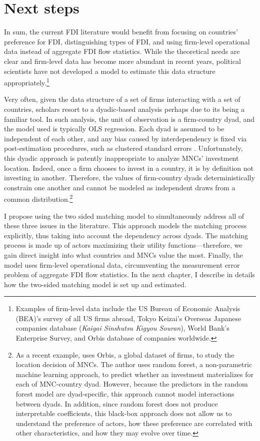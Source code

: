 \section{Next steps}

In sum, the current FDI literature would benefit from focusing on countries'
preference for FDI, distinguishing types of FDI, and using firm-level
operational data instead of aggregate FDI flow statistics. While the theoretical
needs are clear and firm-level data has become more abundant in recent years,
political scientists have not developed a model to estimate this data structure
appropriately.\footnote{Examples of firm-level data include the US Bureau of
  Economic Analysis (BEA)'s survey of all US firms abroad, Tokyo Keizai's
  Overseas Japanese companies database (\textit{Kaigai Sinshutsu Kigyou
    Souran}), World Bank's Enterprise Survey, and Orbis database of companies
  worldwide.}

Very often, given the data structure of a set of firms interacting with a set of
countries, scholars resort to a dyadic-based analysis perhaps due to its being a
familiar tool. In such analysis, the unit of observation is a firm-country dyad,
and the model used is typically OLS regression. Each dyad is assumed to be
independent of each other, and any bias caused by interdependency is fixed via
post-estimation procedures, such as clustered standard errors \citep{Dorff2013}.
Unfortunately, this dyadic approach is patently inappropriate to analyze MNCs'
investment location. Indeed, once a firm chooses to invest in a country, it is
by definition not investing in another. Therefore, the values of firm-country
dyads deterministically constrain one another and cannot be modeled as
independent draws from a common distribution.\footnote{As a recent example,
  \citet{Arel-Bundock2017} uses Orbis, a global dataset of firms, to study the
  location decision of MNCs. The author uses random forest, a non-parametric
  machine learning approach, to predict whether an investment materializes for
  each of MNC-country dyad. However, because the predictors in the random forest
  model are dyad-specific, this approach cannot model interactions between
  dyads. In addition, since random forest does not produce interpretable
  coefficients, this black-box approach does not allow us to understand the
  preference of actors, how these preference are correlated with other
  characteristics, and how they may evolve over time.}

I propose using the two sided matching model to simultaneously address all of
these three issues in the literature. This approach models the matching process
explicitly, thus taking into account the dependency across dyads. The matching
process is made up of actors maximizing their utility functions---therefore, we
gain direct insight into what countries and MNCs value the most. Finally, the
model uses firm-level operational data, circumventing the measurement error
problem of aggregate FDI flow statistics. In the next chapter, I describe in
details how the two-sided matching model is set up and estimated.

